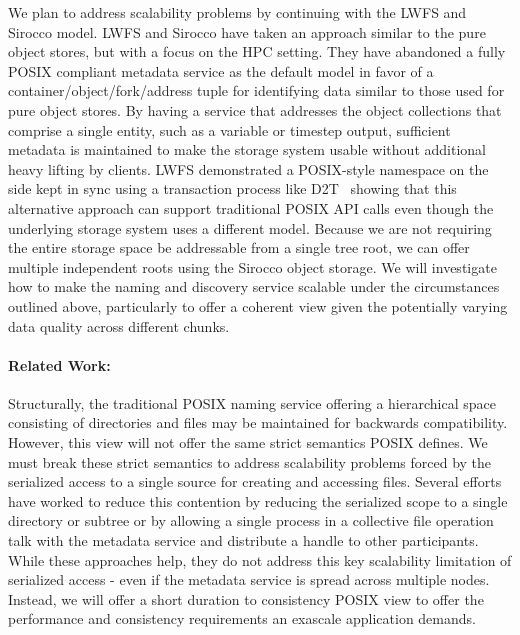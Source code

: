 We plan to address scalability problems by continuing with the LWFS and Sirocco
model. LWFS and Sirocco have taken an approach similar to the pure object
stores, but with a focus on the HPC setting. They have abandoned a fully POSIX
compliant metadata service as the default model in favor of a
container/object/fork/address tuple for identifying data similar to those used
for pure object stores. By having a service that addresses the object
collections that comprise a single entity, such as a variable or timestep
output, sufficient metadata is maintained to make the storage system usable
without additional heavy lifting by clients.  LWFS demonstrated a POSIX-style
namespace on the side kept in sync using a transaction process like
D2T~\cite{lofstead:2012:txn} showing that this alternative approach can support
traditional POSIX API calls even though the underlying storage system uses a
different model. Because we are not requiring the entire storage space be
addressable from a single tree root, we can offer multiple independent roots
using the Sirocco object storage. We will investigate how to make the naming
and discovery service scalable under the circumstances outlined above,
particularly to offer a coherent view given the potentially varying data
quality across different chunks.

\paragraph{Related Work:}
Structurally, the traditional POSIX naming service offering a hierarchical
space consisting of directories and files may be maintained for backwards
compatibility. However, this view will not offer the same strict semantics
POSIX defines. We must break these strict semantics to address scalability
problems forced by the serialized access to a single source for creating and
accessing files.  Several efforts~\cite{patil:2007:giga+,carns:pvfs} have
worked to reduce this contention by reducing the serialized
scope to a single directory or subtree or by allowing a single process in a
collective file operation talk with the metadata service and distribute a
handle to other participants. While these approaches help, they do not address
this key scalability limitation of serialized access - even if the metadata
service is spread across multiple nodes. Instead, we will offer a short
duration to consistency POSIX view to offer the performance and consistency
requirements an exascale application demands.

